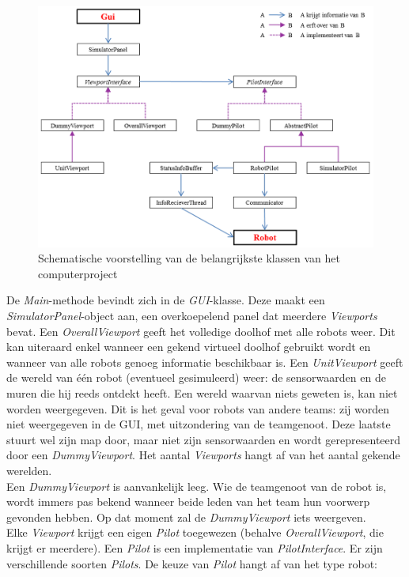 \documentclass[eind]{penoverslag}
\begin{document}
\begin{figure}[h]
\centering
		\includegraphics[width=\textwidth]{KlasSoftware}
\caption[Structuur van computerproject]{Schematische voorstelling van de belangrijkste klassen van het computerproject}
\label{fig:klasSoft}
\end{figure}

De \textit{Main}-methode bevindt zich in de \textit{GUI}-klasse. Deze maakt een \textit{SimulatorPanel}-object aan, een overkoepelend panel dat meerdere \textit{Viewports} bevat. Een \textit{OverallViewport} geeft het volledige doolhof met alle robots weer. Dit kan uiteraard enkel wanneer een gekend virtueel doolhof gebruikt wordt en wanneer van alle robots genoeg informatie beschikbaar is. Een \textit{UnitViewport} geeft de wereld van \'e\'en robot (eventueel gesimuleerd) weer: de sensorwaarden en de muren die hij reeds ontdekt heeft. Een wereld waarvan niets geweten is, kan niet worden weergegeven. Dit is het geval voor robots van andere teams: zij worden niet weergegeven in de GUI, met uitzondering van de teamgenoot. Deze laatste stuurt wel zijn map door, maar niet zijn sensorwaarden en wordt gerepresenteerd door een \textit{DummyViewport}. Het aantal \textit{Viewports} hangt af van het aantal gekende werelden.\\

Een \textit{DummyViewport} is aanvankelijk leeg. Wie de teamgenoot van de robot is, wordt immers pas bekend wanneer beide leden van het team hun voorwerp gevonden hebben. Op dat moment zal de \textit{DummyViewport} iets weergeven.\\

Elke \textit{Viewport} krijgt een eigen \textit{Pilot} toegewezen (behalve \textit{OverallViewport}, die krijgt er meerdere). Een \textit{Pilot} is een implementatie van \textit{PilotInterface}. Er zijn verschillende soorten \textit{Pilots}. De keuze van \textit{Pilot} hangt af van het type robot:
\end{document}
